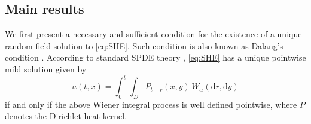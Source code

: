 \documentclass[reqno]{amsart}
\newcommand{\R}{\mathbb R}
\renewcommand{\d}{\mathrm d}
\newcommand{\1}{\mathbf 1}
\numberwithin{equation}{section}
\theoremstyle{definition}
\begin{document}





\subsection{Main results}

We first present a necessary and sufficient condition for the existence of a unique random-field solution to \eqref{eq:SHE}. 
Such condition is also known as Dalang's condition \cite{Dalang}.
According to standard SPDE theory \cite{Walsh, Dalang, DPZ}, \eqref{eq:SHE} has a unique pointwise mild solution given by
\begin{equation}\label{eq:mild}
    u(t,x)=\int_0^t\int_D P_{t-r}(x,y)\,W_\alpha(\d r,\d y)
\end{equation}
if and only if the above Wiener integral process is well defined pointwise, where $P$ denotes the Dirichlet heat kernel.
\end{document}
